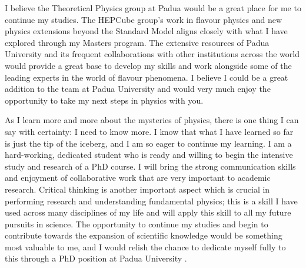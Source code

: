 \documentclass[11pt, a4paper]{awesome-cv}
\newcommand\country{Italy }
\newcommand\uni{Padua University }
\begin{document}
\begin{cvletter}
\lettersection{Why \uni?}
I believe the Theoretical Physics group at Padua would be a great place for me to continue my studies.
The HEPCube group's work in flavour physics and new physics extensions beyond the Standard Model aligns closely with what I have explored through my Masters program. 
The extensive resources of \uni and its frequent collaborations with other institutions across the world would provide a great base to develop my skills and work alongside some of the leading experts in the world of flavour phenomena. 
I believe I could be a great addition to the team at \uni and would very much enjoy the opportunity to take my next steps in physics with you. 

As I learn more and more about the mysteries of physics, there is one thing I can say with certainty: I need to know more. 
I know that what I have learned so far is just the tip of the iceberg, and I am so eager to continue my learning. 
I am a hard-working, dedicated student who is ready and willing to begin the intensive study and research of a PhD course. 
I will bring the strong communication skills and enjoyment of collaborative work that are very important to academic research. 
Critical thinking is another important aspect which is crucial in performing research and understanding fundamental physics; this is a skill I have used across many disciplines of my life and will apply this skill to all my future pursuits in science.
The opportunity to continue my studies and begin to contribute towards the expansion of scientific knowledge would be something most valuable to me, and I would relish the chance to dedicate myself fully to this through a PhD position at \uni. 

\end{cvletter}
\end{document}
